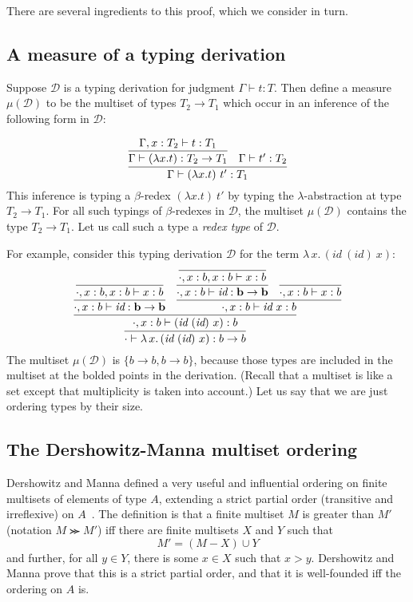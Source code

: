 \documentclass{article}
\begin{document}
There are several ingredients to this proof, which we consider in turn.

\subsection{A measure of a typing derivation}

Suppose $\mathcal{D}$ is a typing derivation for judgment $\Gamma\vdash t : T$.  Then
define a measure $\mu(\mathcal{D})$ to be the multiset of types $T_2 \to T_1$ which occur in an
inference of the following form in $\mathcal{D}$:

\[ 
\infer{\Gamma \vdash (\lambda x.t)\ t' : T_1}
       {\infer{\Gamma \vdash (\lambda x.t) : T_2\to T_1}
              {\Gamma, x : T_2 \vdash t : T_1} & \Gamma \vdash t' : T_2}
\]
\noindent This inference is typing a $\beta$-redex $(\lambda x.t)\ t'$ by
typing the $\lambda$-abstraction at type $T_2\to T_1$.  For all such
typings of $\beta$-redexes in $\mathcal{D}$, the multiset $\mu(\mathcal{D})$
contains the type $T_2 \to T_1$.  Let us call such a type a \emph{redex type}
of $\mathcal{D}$.

For example, consider this typing derivation $\mathcal{D}$ for the term $\lambda\,x.\,(\textit{id}\ (\textit{id})\ x)$:
\[
\infer{\cdot\vdash \lambda\,x.\,(\textit{id}\ (\textit{id})\ x) : b \to b}
      {\infer{\cdot, x : b \vdash (\textit{id}\ (\textit{id})\ x) : b}
        {\infer{\cdot, x : b \vdash \textit{id} : \mathbf{b \to b}}{\infer{\cdot, x : b , x : b \vdash x : b}{\ }} &
          \infer{\cdot , x : b \vdash \textit{id}\ x : b}
                {\infer{\cdot, x : b \vdash \textit{id} : \mathbf{b \to b}}{\infer{\cdot, x : b , x : b \vdash x : b}{\ }} &
                  \infer{\cdot, x : b \vdash x : b}{\ }}}}
\]
\noindent The multiset $\mu(\mathcal{D})$ is $\{ b \to b, b \to b \}$,
because those types are included in the multiset at the bolded points
in the derivation.  (Recall that a multiset is like a set except that multiplicity
is taken into account.)  Let us say that we are just ordering types by their
size.

\subsection{The Dershowitz-Manna multiset ordering}

Dershowitz and Manna defined a very useful and influential ordering on finite multisets of elements of type $A$, extending
a strict partial order (transitive and irreflexive) on $A$~\cite{dm79}.  The definition is that a finite multiset $M$ is
greater than $M'$ (notation $M \ggcurly M'$) iff there are finite multisets $X$ and $Y$ such that
\[
M' = (M - X) \cup Y
\]
\noindent and further, for all $y\in Y$, there is some $x \in X$ such that $x > y$.  Dershowitz and Manna prove that this
is a strict partial order, and that it is well-founded iff the ordering on $A$ is.
\end{document}
